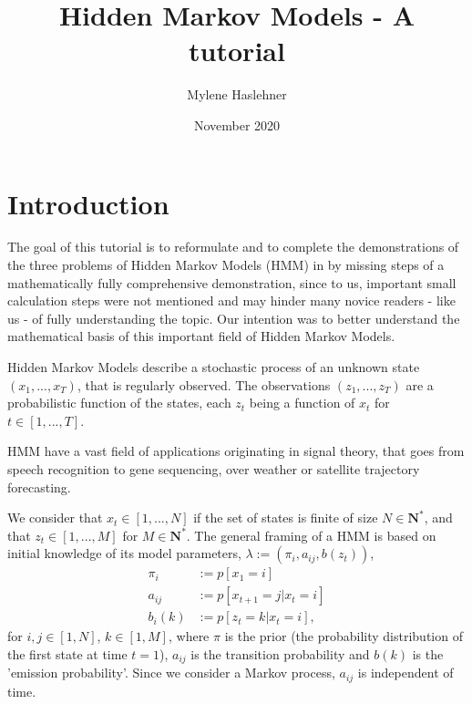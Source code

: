 \documentclass{article}
\title{Hidden Markov Models - A tutorial}
\author{Mylene Haslehner }
\date{November 2020}
\begin{document}
\maketitle
\tableofcontents
\section{Introduction}

The goal of this tutorial is to reformulate and to complete the demonstrations of the three problems of Hidden Markov Models (HMM) in \cite{rab89} by missing steps of a mathematically fully comprehensive demonstration, since to us, important small calculation steps were not mentioned and may hinder many novice readers - like us - of fully understanding the topic. Our intention was to better understand the mathematical basis of this important field of Hidden Markov Models. \newline

Hidden Markov Models describe a stochastic process of an unknown state  $(x_1,...,x_T)$, that is regularly observed. The observations $(z_1,...,z_T)$ are a probabilistic function of the states, each $z_t$ being a function of $x_t$ for $t \in [1,...,T]$. \newline 

HMM have a vast field of applications originating in signal theory, that goes from speech recognition to gene sequencing, over weather or satellite trajectory forecasting. \newline

We consider that $x_t \in [1,...,N]$ if the set of states is finite of size $N \in \mathbf{N}^*$, and that $z_t \in [1,...,M]$ for $M \in \mathbf{N}^*$. 
The general framing of a HMM is based on initial knowledge of its model parameters, $\lambda := (\pi_i, a_{ij}, b(z_t))$,  
\begin{equation} 
\begin{split}
                \pi_i & := p[x_1 = i] \label{e00}\\
                 a_{ij} &:= p[x_{t+1} = j|x_t=i] \\
                 b_i(k) &:= p[z_t=k|x_t=i],
\end{split}
\end{equation} for $i, j \in [1,N]$, $k \in [1,M]$, where 
$\pi $ is the prior (the probability distribution of the first state at time $t=1$), $a_{ij}$ is the transition probability and $b(k)$ is the 'emission probability'. Since we consider a Markov process, $a_{ij}$ is independent of time. \newline
\end{document}
